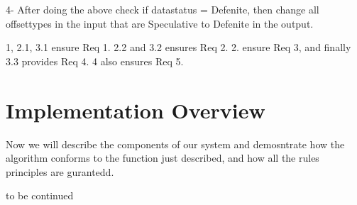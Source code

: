 \documentclass[a4paper, 11pt]{article}
\begin{document}
4- After doing the above check if datastatus = Defenite, then change all offsettypes in the input that are Speculative to Defenite in the output.

1, 2.1, 3.1 ensure Req 1. 2.2 and 3.2 ensures Req 2. 2. ensure Req 3, and finally 3.3 provides Req 4. 4 also ensures Req 5. 












\section{Implementation Overview}

Now we will describe the components of our system and demosntrate how the algorithm conforms to the function just described, and how all the rules principles are gurantedd. 









to be continued

\end{document}
